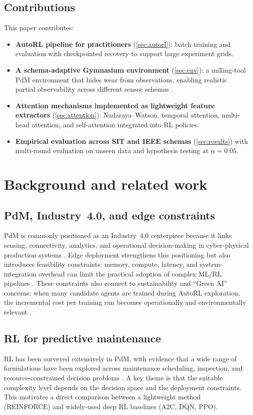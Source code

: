 \documentclass[11pt]{article}
\begin{document}
\subsection{Contributions}
\label{sec:contrib}
This paper contributes:
\begin{itemize}
	\item \textbf{AutoRL pipeline for practitioners} (\cref{sec:autorl}): batch training and evaluation with checkpointed recovery to support large experiment grids.
	\item \textbf{A schema-adaptive Gymnasium environment} (\cref{sec:env}): a milling-tool PdM environment that hides wear from observations, enabling realistic partial observability across different sensor schemas \parencite{Gymnasium2023}.
	\item \textbf{Attention mechanisms implemented as lightweight feature extractors} (\cref{sec:attention}): Nadaraya--Watson, temporal attention, multi-head attention, and self-attention integrated into RL policies.
	\item \textbf{Empirical evaluation across SIT and IEEE schemas} (\cref{sec:results}) with multi-round evaluation on unseen data and hypothesis testing at $\alpha=0.05$.
\end{itemize}

\section{Background and related work}
\label{sec:background}
\subsection{PdM, Industry~4.0, and edge constraints}
PdM is commonly positioned as an Industry~4.0 centerpiece because it links sensing, connectivity, analytics, and operational decision-making in cyber-physical production systems \parencite{Compare2020IoT, Zonta2020PdM}. Edge deployment strengthens this positioning but also introduces feasibility constraints: memory, compute, latency, and system-integration overhead can limit the practical adoption of complex ML/RL pipelines \parencite{Njor2024TinyML, Pandey2023EdgeDNN}. These constraints also connect to sustainability and ``Green AI'' concerns: when many candidate agents are trained during AutoRL exploration, the incremental cost per training run becomes operationally and environmentally relevant \parencite{Schwartz2020GreenAI, Strubell2019Energy}.

\subsection{RL for predictive maintenance}
RL has been surveyed extensively in PdM, with evidence that a wide range of formulations have been explored across maintenance scheduling, inspection, and resource-constrained decision problems \parencite{Siraskar2023RLReview}. A key theme is that the suitable complexity level depends on the decision space and the deployment constraints. This motivates a direct comparison between a lightweight method (REINFORCE) and widely-used deep RL baselines (A2C, DQN, PPO).
\end{document}
